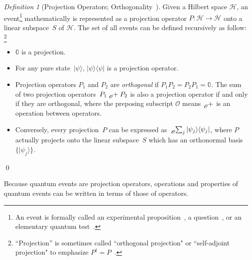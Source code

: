 \documentclass{article}
\theoremstyle{remark}
\newtheorem{definition}{Definition}
\newcommand{\Hilb}{\mathcal{H}}
\newcommand{\ket}[1]{|#1\rangle}
\newcommand{\proj}[1]{|#1 \rangle\langle #1 |}
\begin{document}
\begin{definition}[Projection Operators;
Orthogonality~\cite{10.2307/2308516,Redhead1987-REDINA,peres1995quantum,Griffiths2003,Swart2013}]
\label{def:Projection} Given a Hilbert space $\Hilb$, an event\footnote{An event
is formally called an experimental proposition~\cite{BirkhoffVonNeumann1936}, a question~\cite{10.2307/2308516,DBLP:journals/corr/abs-0910-2393}, or an
elementary quantum test~\cite{peres1995quantum}.} mathematically is represented as a projection operator $P:\Hilb\rightarrow\Hilb$ onto a linear subspace~$S$ of $\Hilb$. The set of all events can be defined recursively as follow:
\footnote {``Projection'' is sometimes called
``orthogonal projection" or ``self-adjoint projection" to
emphasize $P^{\dagger} = P$~\cite{Griffiths2003,Maassen2010}.}
\begin{itemize}
\item $\mathbb{0}$ is a projection. 
\item For any pure state~$\ket{\psi}$, $\proj{\psi}$ is a projection
operator. 
\item Projection operators $P_1$ and $P_2$ are \emph{orthogonal} if $P_1P_2 =
  P_2P_1 = \mathbb{0}$. The sum of two projection operators~$P_{1}\tensor*[_{\mathscr{O}}]{+}{}P_{2}$
is also a projection operator if and only if they are orthogonal, 
where the preposing subscript $\mathscr{O}$
means $\tensor*[_{\mathscr{O}}]{+}{}$ is an operation between operators. 
\item Conversely, every projection~$P$ can be expressed as
$\tensor*[_{\mathscr{O}}]{\sum}{_j}\proj{\psi_{j}}$,
where $P$ actually projects onto the linear subspace~$S$ which
has an orthonormal basis~$\{\ket{\psi_{j}}\}$. 
\end{itemize}
\qed\end{definition}

Because quantum events are projection operators, operations and properties
of quantum events can be written in terms of those of operators.
\end{document}

